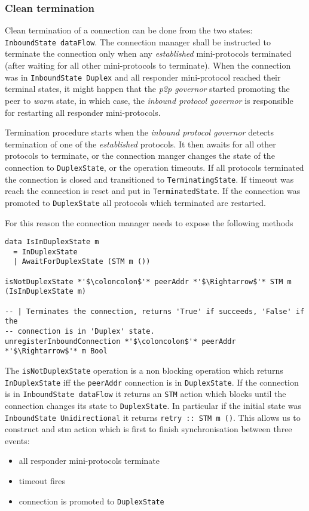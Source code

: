 \documentclass{article}
\def\DuplexState{\texttt{DuplexState}}
\def\InboundStateUni{\texttt{InboundState Unidirectional}}
\def\InboundStateDup{\texttt{InboundState Duplex}}
\def\InboundStateAny{\texttt{InboundState dataFlow}}
\def\TerminatingState{\texttt{TerminatingState}}
\def\TerminatedState{\texttt{TerminatedState}}
\def\warm{\textit{warm}}
\def\established{\textit{established}}
\def\ptopgov{\textit{p2p governor}}
\def\inbgov{\textit{inbound protocol governor}}
\begin{document}
\subsubsection{Clean termination}
Clean termination of a connection can be done from the two states:
\InboundStateAny{}.  The connection manager shall be instructed to terminate
the connection only when any \established{} mini-protocols terminated (after
waiting for all other mini-protocols to terminate).  When the connection was in
\InboundStateDup{} and all responder mini-protocol reached their terminal
states, it might happen that the \ptopgov{} started promoting the peer to
\warm{} state, in which case, the \inbgov{} is responsible for restarting all
responder mini-protocols.

Termination procedure starts when the \inbgov{} detects termination of one of
the \established{} protocols.   It then awaits for all other protocols to
terminate, or the connection manger changes the state of the connection to
\DuplexState{}, or the operation timeouts.  If all protocols terminated the
connection is closed and transitioned to
\TerminatingState{}.  If timeout was reach the connection is reset and put in
\TerminatedState{}.  If the connection was promoted to \DuplexState{} all
protocols which terminated are restarted.

For this reason the connection manager needs to expose the following methods
\begin{lstlisting}
data IsInDuplexState m
  = InDuplexState
  | AwaitForDuplexState (STM m ())

isNotDuplexState *'$\coloncolon$'* peerAddr *'$\Rightarrow$'* STM m (IsInDuplexState m)

-- | Terminates the connection, returns 'True' if succeeds, 'False' if the
-- connection is in 'Duplex' state.
unregisterInboundConnection *'$\coloncolon$'* peerAddr *'$\Rightarrow$'* m Bool
\end{lstlisting}

The \texttt{isNotDuplexState} operation is a non blocking operation which
returns \texttt{InDuplexState} iff the \texttt{peerAddr} connection is in
\DuplexState{}.  If the connection is in \texttt{InboundState dataFlow} it
returns an \texttt{STM} action which blocks until the connection changes its
state to \DuplexState{}.  In particular if the initial state was
\InboundStateUni{} it returns \texttt{retry :: STM m ()}.  This allows us to
construct and stm action which is first to finish synchronisation between three
events:
\begin{itemize}
  \item all responder mini-protocols terminate
  \item timeout fires
  \item connection is promoted to \DuplexState{}
\end{itemize}
\end{document}
